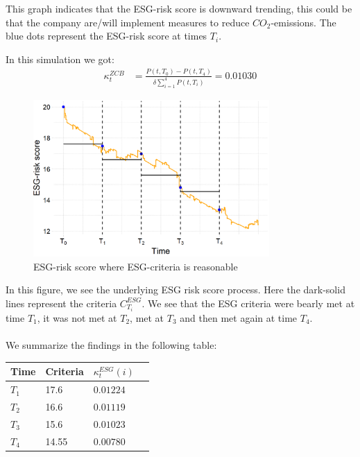 This graph indicates that the ESG-risk score is downward trending, this could be that the company are/will implement measures to reduce $CO_{2}$-emissions.
The blue dots represent the ESG-risk score at times $T_{i}$. 


\newpage 

In this simulation we got: 
\begin{align*}
\kappa_{t}^{ZCB} &= \frac{P(t,T_{0})-P(t,T_{4})}{\delta \sum_{i=1}^{4}P(t,T_{i})} = 0.01030   
\end{align*}

\begin{figure}[htp]
    \centering
    \includegraphics[width= 9cm]{figures/ESG/ESG_plt_criteria.png}
    \caption{ESG-risk score where ESG-criteria is reasonable}
    \label{fig: ESG-risk_criteria1}
\end{figure}

In this figure, we see the underlying ESG risk score process. Here the dark-solid lines represent the criteria $C_{T_{i}}^{ESG}$. We see that the ESG criteria were bearly met at time $T_{1}$, it was not met at $T_{2}$, met at $T_{3}$ and then met again at time $T_{4}$. 
\\~\\ 
We summarize the findings in the following table:
\begin{center}
    \begin{tabular}{ | l | l | l | p{5cm} |}
    \hline
    Time    &   Criteria  & $\kappa_{t}^{ESG}(i)$ \\ \hline
    $T_{1}$ &      17.6   & $0.01224$  \\ \hline
    $T_{2}$ &      16.6   & $0.01119$  \\ \hline
    $T_{3}$ &      15.6   & $0.01023$  \\ \hline
    $T_{4}$ &      14.55  & $0.00780$   \\ \hline
    \end{tabular}
\end{center} 


